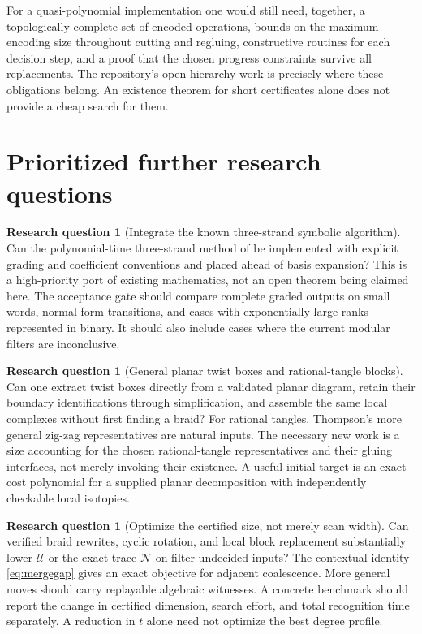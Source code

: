\documentclass[11pt,letterpaper]{article}
\theoremstyle{definition}
\newtheorem{question}[theorem]{Research question}
\newcommand{\N}{\mathcal N}
\newcommand{\U}{\mathcal U}
\begin{document}
For a quasi-polynomial implementation one would still need, together, a topologically complete set of encoded operations, bounds on the maximum encoding size throughout cutting and regluing, constructive routines for each decision step, and a proof that the chosen progress constraints survive all replacements. The repository's open hierarchy work is precisely where these obligations belong. An existence theorem for short certificates alone does not provide a cheap search for them.

\section{Prioritized further research questions}\label{sec:future}
\begin{question}[Integrate the known three-strand symbolic algorithm]
Can the polynomial-time three-strand method of \cite{ks26} be implemented with explicit grading and coefficient conventions and placed ahead of basis expansion? This is a high-priority port of existing mathematics, not an open theorem being claimed here. The acceptance gate should compare complete graded outputs on small words, normal-form transitions, and cases with exponentially large ranks represented in binary. It should also include cases where the current modular filters are inconclusive.
\end{question}

\begin{question}[General planar twist boxes and rational-tangle blocks]
Can one extract twist boxes directly from a validated planar diagram, retain their boundary identifications through simplification, and assemble the same local complexes without first finding a braid? For rational tangles, Thompson's more general zig-zag representatives are natural inputs. The necessary new work is a size accounting for the chosen rational-tangle representatives and their gluing interfaces, not merely invoking their existence. A useful initial target is an exact cost polynomial for a supplied planar decomposition with independently checkable local isotopies.
\end{question}

\begin{question}[Optimize the certified size, not merely scan width]
Can verified braid rewrites, cyclic rotation, and local block replacement substantially lower \(\U\) or the exact trace \(\N\) on filter-undecided inputs? The contextual identity \cref{eq:mergegap} gives an exact objective for adjacent coalescence. More general moves should carry replayable algebraic witnesses. A concrete benchmark should report the change in certified dimension, search effort, and total recognition time separately. A reduction in \(t\) alone need not optimize the best degree profile.
\end{question}
\end{document}
